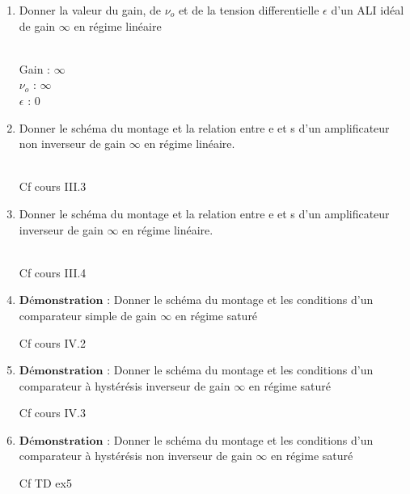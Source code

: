 \begin{enumerate}[label=\arabic{enumi} - , left=0pt, itemsep=1em]
\begin{solution}
    \end{solution}

    \item Donner la valeur du gain, de $\nu_o$ et de la tension differentielle $\epsilon$ d'un ALI idéal de gain $\infty$ en régime linéaire \par
    \begin{solution}\\
        Gain : $\infty$\\
        $\nu_o$ : $\infty$\\
        $\epsilon$ : 0

    \end{solution}

    \item Donner le schéma du montage et la relation entre e et s d'un amplificateur non inverseur de gain  $\infty$  en régime linéaire. \par
    \begin{solution}\\
        Cf cours III.3
    \end{solution}

    \item Donner le schéma du montage et la relation entre e et s d'un amplificateur inverseur de gain  $\infty$ en régime linéaire. \par
    \begin{solution}\\
        Cf cours III.4
    \end{solution}

    \item  $\textbf{Démonstration :}$ Donner le schéma du montage et les conditions d'un comparateur simple de gain  $\infty$ en régime saturé \par
    \begin{solution}
        Cf cours IV.2
    \end{solution}

    \item  $\textbf{Démonstration :}$ Donner le schéma du montage et les conditions d'un comparateur à hystérésis inverseur de gain  $\infty$ en régime saturé \par
    \begin{solution}
        Cf cours IV.3
    \end{solution}

    \item  $\textbf{Démonstration :}$ Donner le schéma du montage et les conditions d'un comparateur à hystérésis non inverseur de gain  $\infty$ en régime saturé \par
    \begin{solution}
        Cf TD ex5
    \end{solution}
    
\end{enumerate}

